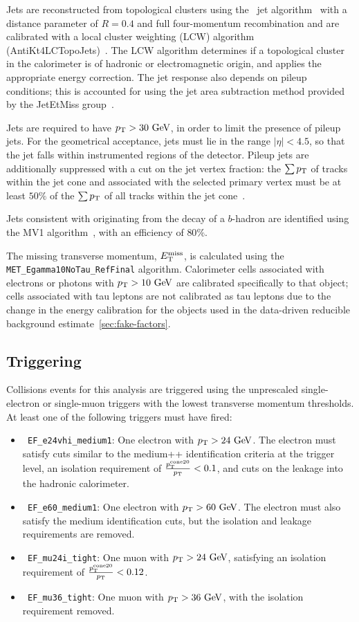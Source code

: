 Jets are reconstructed from topological clusters using the \antikt\ jet algorithm~\cite{Cacciari:2008gp} with a distance parameter of $R = 0.4$ and full four-momentum recombination and are calibrated with a local cluster weighting (LCW) algorithm ({AntiKt4LCTopoJets})~\cite{ATLAS-CONF-2010-053}. The LCW algorithm determines if a topological cluster in the calorimeter is of hadronic or electromagnetic origin, and applies the appropriate energy correction. The jet response also depends on pileup conditions; this is accounted for using the jet area subtraction method provided by the JetEtMiss group~\cite{JetEtmissRecommendations2012}.

Jets are required to have $p_{\text{T}}>30~\mbox{GeV}$, in order to limit the presence of pileup jets. For the geometrical acceptance, jets must lie in the range $|\eta|<4.5$, so that the jet falls within instrumented regions of the detector. Pileup jets are additionally suppressed with a cut on the jet vertex fraction: the $\sum p_{\text{T}}$ of tracks within the jet cone and associated with the selected primary vertex must be at least $50\%$ of the $\sum p_{\text{T}}$ of all tracks within the jet cone~\cite{jvf}. 

Jets consistent with originating from the decay of a $b$-hadron are identified using the MV1 algorithm~\cite{MV1}, with an efficiency of $80\%$. 

The missing transverse momentum, $E_{\text{T}}^{\text{miss}}$, is calculated using the \texttt{ MET\_Egamma10NoTau\_RefFinal} algorithm. Calorimeter cells associated with electrons or photons with $\pt>10 \GeV$ are calibrated specifically to that object; cells associated with tau leptons are not calibrated as tau leptons due to the change in the energy calibration for the objects used in the data-driven reducible background estimate~\ref{sec:fake-factors}. 

\subsection{Triggering}
Collisions events for this analysis are triggered using the unprescaled single-electron or single-muon triggers with the lowest transverse momentum thresholds. At least one of the following triggers must have fired:

\begin{itemize}
	\item \texttt{ EF\_e24vhi\_medium1}: One electron with $\pt>24 \GeV$. The electron must satisfy cuts similar to the medium++ identification criteria at the trigger level, an isolation requirement of $\frac{p_{\text{T}}^{\mathrm{cone}20}}{p_{\text{T}}}<0.1$, and cuts on the leakage into the hadronic calorimeter.
	\item \texttt{ EF\_e60\_medium1}: One electron with $\pt>60 \GeV$. The electron must also satisfy the medium identification cuts, but the isolation and leakage requirements are removed.
	\item \texttt{ EF\_mu24i\_tight}: One muon with $\pt>24 \GeV$, satisfying an isolation requirement of $\frac{p_{\text{T}}^{\mathrm{cone}20}}{p_{\text{T}}}<0.12$.
	\item \texttt{ EF\_mu36\_tight}: One muon with $\pt>36 \GeV$, with the isolation requirement removed.
\end{itemize}

